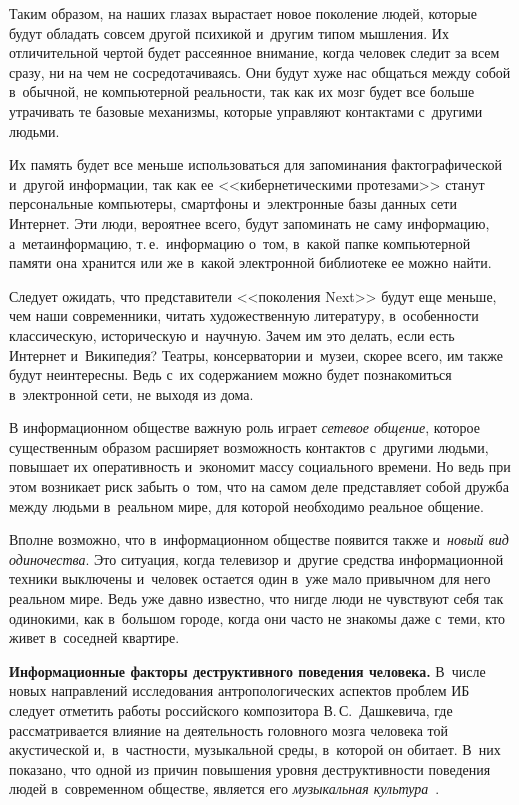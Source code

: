 \begin{multicols}{2}
    Таким образом, на наших глазах вырастает новое поколение людей, 
которые будут обладать совсем другой психикой и~другим типом мышления. 
Их отличительной чертой будет рассеянное внимание, когда человек следит 
за всем сразу, ни на чем не сосредотачиваясь. Они будут хуже нас общаться 
между собой в~обычной, не компьютерной реальности, так как их мозг будет 
все больше утрачивать те базовые механизмы, которые управляют 
контактами с~другими людьми. 
    
    Их память будет все меньше использоваться для запоминания 
фактографической и~другой информации, так как ее <<кибернетическими 
протезами>> станут персональные компьютеры, смартфоны и~электронные 
базы данных сети Интернет. Эти люди, вероятнее всего, будут запоминать не 
саму информацию, а~метаинформацию, т.\,е.\ информацию о~том, в~какой 
папке компьютерной памяти она хранится или же в~какой электронной 
библиотеке ее можно найти. 
    
    Следует ожидать, что представители <<поколения Next>> будут еще 
меньше, чем наши современники, читать художественную литературу, 
в~особенности классическую, историческую и~научную. Зачем им это делать, 
если есть Интернет и~Википедия? Теат\-ры, консерватории и~музеи, скорее 
всего, им также будут неинтересны. Ведь с~их содержанием можно будет 
познакомиться в~электронной сети, не выходя из дома. 
    
    В информационном обществе важную роль играет \textit{сетевое 
общение}, которое существенным образом расширяет возможность контактов 
с~другими людьми, повышает их оперативность и~экономит массу 
социального времени. Но ведь при этом возникает риск забыть о~том, что на 
самом деле представляет собой дружба между людьми в~реальном мире, для 
которой необходимо реальное общение. 
    
    Вполне возможно, что в~информационном обществе появится также 
и~\textit{новый вид одиночества}. Это ситуация, когда телевизор и~другие 
средства информационной техники выключены и~человек остается один 
в~уже мало привычном для него реальном мире. Ведь уже давно известно, 
что нигде люди не чувствуют себя так одинокими, как в~большом городе, 
когда они часто не знакомы даже с~теми, кто живет в~соседней квартире. 
    
    \textbf{Информационные факторы деструктивного поведения 
человека.} В~числе новых направлений исследования антропологических 
аспектов проблем ИБ следует отметить работы 
российского композитора В.\,С.~Дашкевича, где рассматривается влияние на 
деятельность головного мозга человека той акустической и,~в~част\-ности, 
музыкальной среды, в~которой он обитает. В~них показано, что одной из 
причин повышения уровня деструктивности поведения людей в~современном 
обществе, является его \textit{музыкальная культура}~\cite{30-kol}. 
     

\end{multicols}
